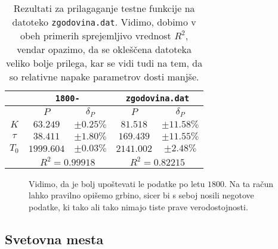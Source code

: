 \documentclass[a4 paper, 12pt]{article}
\begin{document}
\begin{table}[H]\centering
	\caption{Rezultati za prilagaganje testne funkcije na datoteko {\tt zgodovina.dat}. Vidimo, dobimo v obeh
		primerih sprejemljivo vrednost $R^2$, vendar opazimo, da se okle\v s\v cena datoteka veliko bolje
		prilega, kar se vidi tudi na tem, da so relativne napake parametrov dosti manj\v se.}
	\begin{tabular}{c|c|c||c|c}
		& \multicolumn{2}{c|}{\tt 1800-} & \multicolumn{2}{c}{\tt zgodovina.dat} \\
		\hline
		& $P$ & $\delta_P$ & $P$ & $\delta_P$ \\
		\hline\hline
		$K$ & $63.249$ & $\pm 0.25 \%$    & $81.518$ & $\pm 11.58 \%$ \\
		$\tau$ & $38.411$ & $\pm 1.80 \%$ & $169.439$ & $\pm 11.55 \%$ \\
		$T_0$ & $1999.604$ & $\pm 0.03\%$ & $2141.002$ & $\pm 2.48 \%$ \\
		\hline
		& \multicolumn{2}{c|}{$R^2 = 0.99918$} & \multicolumn{2}{c}{$R^2 = 0.82215$}
	\end{tabular}
	\label{tab0}
\end{table}

\begin{figure}[H]\centering
	
	\caption{Vidimo, da je bolj upo\v stevati le podatke po letu $1800$. Na ta ra\v cun lahko pravilno opi\v semo
		grbino, sicer bi s seboj nosili negotove podatke, ki tako ali tako nimajo tiste prave verodostojnosti.}
	\label{sl:clo}
\end{figure}

\subsection{Svetovna mesta}
\end{document}
